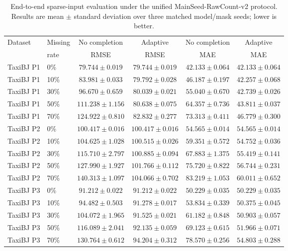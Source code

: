 \begin{table}[!htbp]
\centering
\caption{End-to-end sparse-input evaluation under the unified MainSeed-RawCount-v2 protocol. Results are mean $\pm$ standard deviation over three matched model/mask seeds; lower is better.}
\label{tab:sparse-end-to-end}
\small
\setlength{\tabcolsep}{4pt}
\begin{tabular}{llcccc}
\toprule
Dataset & Missing & No completion & Adaptive & No completion & Adaptive \\
 & rate & RMSE & RMSE & MAE & MAE \\
\midrule
TaxiBJ P1 & 0\% & $79.744\pm0.019$ & $79.744\pm0.019$ & $42.133\pm0.064$ & $42.133\pm0.064$ \\
TaxiBJ P1 & 10\% & $83.981\pm0.033$ & $79.792\pm0.028$ & $46.187\pm0.197$ & $42.257\pm0.068$ \\
TaxiBJ P1 & 30\% & $96.670\pm0.659$ & $80.039\pm0.021$ & $55.040\pm0.670$ & $42.739\pm0.026$ \\
TaxiBJ P1 & 50\% & $111.238\pm1.156$ & $80.638\pm0.075$ & $64.357\pm0.736$ & $43.811\pm0.037$ \\
TaxiBJ P1 & 70\% & $124.922\pm0.810$ & $82.832\pm0.277$ & $73.313\pm0.411$ & $46.779\pm0.300$ \\
\addlinespace
TaxiBJ P2 & 0\% & $100.417\pm0.016$ & $100.417\pm0.016$ & $54.565\pm0.014$ & $54.565\pm0.014$ \\
TaxiBJ P2 & 10\% & $104.625\pm1.028$ & $100.515\pm0.026$ & $59.351\pm0.572$ & $54.752\pm0.036$ \\
TaxiBJ P2 & 30\% & $115.710\pm2.797$ & $100.885\pm0.094$ & $67.883\pm1.375$ & $55.419\pm0.141$ \\
TaxiBJ P2 & 50\% & $127.990\pm1.927$ & $101.766\pm0.112$ & $75.720\pm0.822$ & $56.744\pm0.231$ \\
TaxiBJ P2 & 70\% & $140.313\pm1.097$ & $104.066\pm0.702$ & $83.219\pm1.053$ & $60.011\pm0.652$ \\
\addlinespace
TaxiBJ P3 & 0\% & $91.212\pm0.022$ & $91.212\pm0.022$ & $50.229\pm0.035$ & $50.229\pm0.035$ \\
TaxiBJ P3 & 10\% & $94.482\pm0.503$ & $91.278\pm0.017$ & $53.834\pm0.339$ & $50.375\pm0.045$ \\
TaxiBJ P3 & 30\% & $104.072\pm1.965$ & $91.525\pm0.021$ & $61.182\pm0.848$ & $50.903\pm0.057$ \\
TaxiBJ P3 & 50\% & $116.089\pm2.041$ & $92.135\pm0.059$ & $69.123\pm0.615$ & $51.966\pm0.071$ \\
TaxiBJ P3 & 70\% & $130.764\pm0.612$ & $94.204\pm0.312$ & $78.570\pm0.256$ & $54.803\pm0.288$ \\

\end{tabular}
\end{table}

